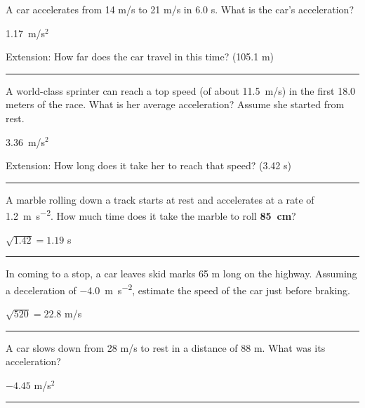 \documentclass[12pt]{exam}
\begin{document}
\Large

\def\mystrut{\protect\rule[-2.2ex]{0ex}{2.2ex}} 
\qformat{ \textbf{Task \#\thequestion}
  \ifthenelse{\equal{\thequestion}{\thequestiontitle}}
    {}
    {: \emph{\thequestiontitle}}
  \mystrut  \hfill}


\begin{questions}


\question
  A car accelerates from 14 m/s to 21 m/s in 6.0 s.  What is the car's acceleration?

  \begin{solution}
    1.17~m/s$^2$

    Extension: How far does the car travel in this time? (105.1 m)
  \end{solution}


\vs \hrule \vs

\question
  A world-class sprinter can reach a top speed (of about 11.5~m/s) in the first 18.0 meters of the race.  What is her average acceleration?  Assume she started from rest.

  \begin{solution}
    3.36~m/s$^2$

    Extension: How long does it take her to reach that speed? (3.42 s)

  \end{solution}

\vs
\ifprintanswers
  \hrule \vs
\else
  \pagebreak

\fi

\question
  A marble rolling down a track starts at rest and accelerates at a rate of \SI{1.2}{\meter\per\second^2}.  How much time does it take the marble to roll {\bf 85~cm}?

  \begin{solution}
    $\sqrt{1.42}=1.19$ s
  \end{solution}

  

\vs \hrule \vs

\question
  In coming to a stop, a car leaves skid marks 65 m long on the highway.  Assuming a deceleration of \SI{-4.0}{\meter\per\second^2}, estimate the speed of the car just before braking.

  \begin{solution}
    $\sqrt{520}=22.8$ m/s
  \end{solution}

\vs
\ifprintanswers
  \hrule \vs
\else
  \pagebreak
\fi

\question
  A car slows down from 28 m/s to rest in a distance of 88 m. What was its acceleration?

  \begin{solution}
    $-4.45$ m/s$^2$
  \end{solution}

\vs \hrule \vs[2]


\end{questions}
\end{document}
